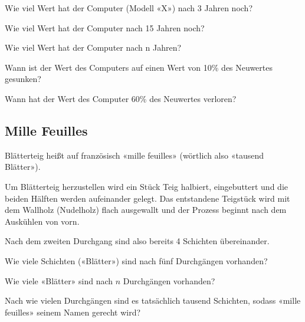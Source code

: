 \begin{bbwAufgabenBlock}
\item  Wie viel Wert hat der Computer (Modell «X») nach 3 Jahren
noch?  \plz{}
\item Wie viel Wert hat der Computer nach 15 Jahren noch?  \plz{}
\item Wie viel Wert hat der Computer nach n Jahren?  \plz{} \noTRAINER{\newpage}
\item Wann ist der Wert des Computers auf einen Wert von 10\% des
Neuwertes gesunken?  \plz{}
\item Wann hat der Wert des Computer 60\% des Neuwertes
verloren?  \plz{}
\end{bbwAufgabenBlock}

\platzFuerBerechnungenBisEndeSeite{}
\subsection{Mille Feuilles}
Blätterteig heißt auf französisch «mille feuilles» (wörtlich also
«tausend Blätter»).

Um Blätterteig herzustellen wird ein Stück Teig halbiert, eingebuttert
und die beiden Hälften werden aufeinander gelegt. Das entstandene
Teigstück wird mit dem Wallholz (Nudelholz) flach ausgewallt und der
Prozess beginnt nach dem Auskühlen von vorn.

Nach dem zweiten Durchgang sind also bereits 4 Schichten übereinander.

\begin{bbwAufgabenBlock}
\item Wie viele Schichten («Blätter») sind nach fünf Durchgängen
vorhanden?  \plz{}

\item Wie viele «Blätter» sind nach $n$ Durchgängen
vorhanden?  \plz{}

\item Nach wie vielen Durchgängen sind es tatsächlich tausend
Schichten, sodass «mille feuilles» seinem Namen gerecht
wird? 

\end{bbwAufgabenBlock}

